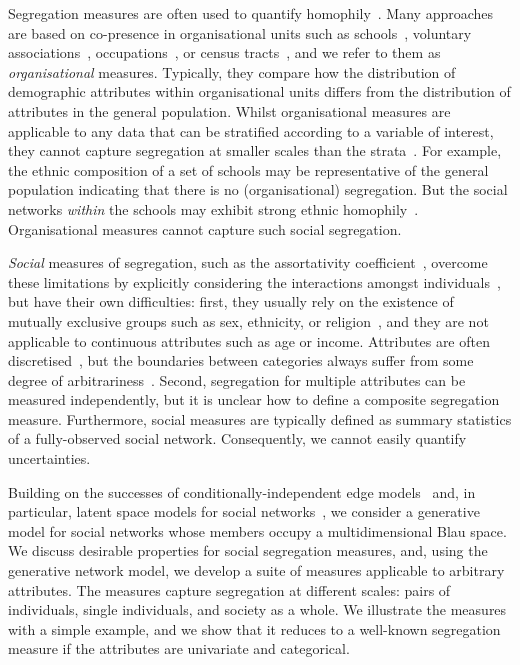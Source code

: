 \documentclass{scrartcl}
\begin{document}
Segregation measures are often used to quantify homophily~\cite{Rodriguez-Moral2016, Bojanowski2014}. Many approaches are based on co-presence in organisational units such as schools~\cite{Orfield2014}, voluntary associations~\cite{Popielarz1999}, occupations~\cite{Charles1995}, or census tracts~\cite{Reardon2004,Reardon2011}, and we refer to them as \emph{organisational} measures. Typically, they compare how the distribution of demographic attributes within organisational units differs from the distribution of attributes in the general population. Whilst organisational measures are applicable to any data that can be stratified according to a variable of interest, they cannot capture segregation at smaller scales than the strata~\cite{Blumenstock2013}. For example, the ethnic composition of a set of schools may be representative of the general population indicating that there is no (organisational) segregation. But the social networks \emph{within} the schools may exhibit strong ethnic homophily~\cite{Currarini2009,Moody2001}.
Organisational measures cannot capture such social segregation.

\emph{Social} measures of segregation, such as the assortativity coefficient~\cite{Newman2003a}, overcome these limitations by explicitly considering the interactions amongst individuals~\cite{Blumenstock2013}, but have their own difficulties: first, they usually rely on the existence of mutually exclusive groups such as sex, ethnicity, or religion~\cite{Bojanowski2014}, and they are not applicable to continuous attributes such as age or income. Attributes are often discretised~\cite{Lam-Morgan2012, Kalmijn2007, Kim2012},
but the boundaries between categories always suffer from some degree of arbitrariness~\cite{Reardon2004}. Second, segregation for multiple attributes can be measured independently, but it is unclear how to define a composite segregation measure. Furthermore, social measures are typically defined as summary statistics of a fully-observed social network. Consequently, we cannot easily quantify uncertainties. %

Building on the successes of conditionally-independent edge models~\cite{Snijders2011} and, in particular, latent space models for social networks~\cite{Hoff2002,Handcock2007,Raftery2012}, we consider a generative model for social networks whose members occupy a multidimensional Blau space. We discuss desirable properties for social segregation measures, and, using the generative network model, we develop a suite of measures applicable to arbitrary attributes. The measures capture segregation at different scales: pairs of individuals, single individuals, and society as a whole. We illustrate the measures with a simple example, and we show that it reduces to a well-known segregation measure if the attributes are univariate and categorical.
\end{document}
